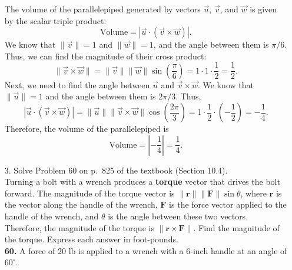 \documentclass[reqno, 12pt]{amsart}
\begin{document}
\begin{itemize}
{{        The volume of the parallelepiped generated by vectors $\vec{u}$, $\vec{v}$, and $\vec{w}$ is given by the scalar triple product:
        \[
            \text{Volume} = |\vec{u} \cdot (\vec{v} \times \vec{w})|.
        \]
        We know that $\|\vec{v}\| = 1$ and $\|\vec{w}\| = 1$, and the angle between them is $\pi/6$. Thus, we can find the magnitude of their cross product:
        \[
            \|\vec{v} \times \vec{w}\| = \|\vec{v}\| \|\vec{w}\| \sin\left(\frac{\pi}{6}\right) = 1 \cdot 1 \cdot \frac{1}{2} = \frac{1}{2}.
        \]
        Next, we need to find the angle between $\vec{u}$ and $\vec{v} \times \vec{w}$. We know that $\|\vec{u}\| = 1$ and the angle between them is $2\pi/3$. Thus,
        \[
            |\vec{u} \cdot (\vec{v} \times \vec{w})| = \|\vec{u}\| \|\vec{v} \times \vec{w}\| \cos\left(\frac{2\pi}{3}\right) = 1 \cdot \frac{1}{2} \cdot \left(-\frac{1}{2}\right) = -\frac{1}{4}.
        \]
        Therefore, the volume of the parallelepiped is
        \[
            \text{Volume} = \left| -\frac{1}{4} \right| = \frac{1}{4}.
        \]
    }%
}
\vspace{0.5 in}

\newpage
\item[3.] Solve Problem 60 on p.~825 of the textbook (Section 10.4).\\
Turning a bolt with a wrench produces a \textbf{torque} vector that drives the bolt forward. The magnitude of the torque vector is $\|\mathbf{r}\| \|\mathbf{F}\| \sin\theta$, where $\mathbf{r}$ is the vector along the handle of the wrench, $\mathbf{F}$ is the force vector applied to the handle of the wrench, and $\theta$ is the angle between these two vectors. Therefore, the magnitude of the torque is $\|\mathbf{r} \times \mathbf{F}\|$. Find the magnitude of the torque. Express each answer in foot-pounds.\\
\textbf{60.} A force of 20 lb is applied to a wrench with a 6-inch handle at an angle of $60^\circ$.
\newline

\noindent{}


\end{itemize}
\end{document}

